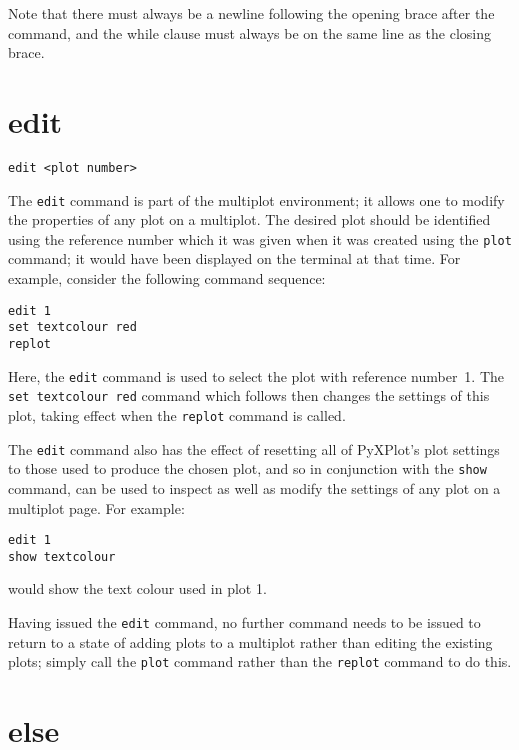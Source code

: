 Note that there must always be a newline following the opening brace after the
 command, and the while clause must always be on the same line as the
closing brace.

\section{edit}

\begin{verbatim}
edit <plot number>
\end{verbatim}

The {\tt edit} command is part of the multiplot environment; it allows one to
modify the properties of any plot on a multiplot. The desired plot should be
identified using the reference number which it was given when it was created
using the {\tt plot} command; it would have been displayed on the terminal at
that time. For example, consider the following command sequence:

\begin{verbatim}
edit 1
set textcolour red
replot
\end{verbatim}

\noindent Here, the {\tt edit} command is used to select the plot with
reference number~1. The {\tt set textcolour red} command which follows then
changes the settings of this plot, taking effect when the {\tt replot} command
is called.

The {\tt edit} command also has the effect of resetting all of PyXPlot's plot
settings to those used to produce the chosen plot, and so in conjunction with
the {\tt show} command, can be used to inspect as well as modify the settings of
any plot on a multiplot page. For example:

\begin{verbatim}
edit 1
show textcolour
\end{verbatim}

\noindent would show the text colour used in plot 1.

Having issued the {\tt edit} command, no further command needs to be issued to
return to a state of adding plots to a multiplot rather than editing the
existing plots; simply call the {\tt plot} command rather than the {\tt replot}
command to do this.

\section{else}

